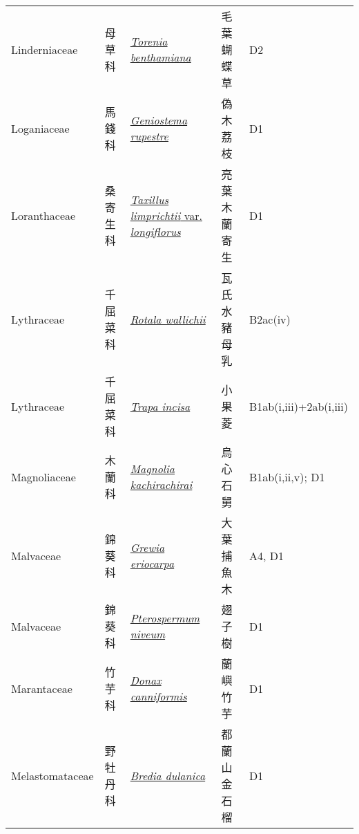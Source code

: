 {\begin{longtable}{p{2.5cm}p{2.5cm}p{4.5cm}p{2.5cm}p{3cm}}
    Linderniaceae & 母草科 & \href{http://www.theplantlist.org/tpl1.1/search?q=Torenia+benthamiana}{\textit{Torenia benthamiana} } & 毛葉蝴蝶草 & D2 \index{Torenia@\textit{Torenia}!benthamiana@\textit{benthamiana}}  \index{毛葉蝴蝶草} \\
    Loganiaceae & 馬錢科 & \href{http://www.theplantlist.org/tpl1.1/search?q=Geniostema+rupestre}{\textit{Geniostema rupestre} } & 偽木荔枝 & D1 \index{Geniostema@\textit{Geniostema}!rupestre@\textit{rupestre}}  \index{偽木荔枝} \\
    Loranthaceae & 桑寄生科 & \href{http://www.theplantlist.org/tpl1.1/search?q=Taxillus+limprichtii+var.+longiflorus}{\textit{Taxillus limprichtii} var. \textit{longiflorus} } & 亮葉木蘭寄生 & D1 \index{Taxillus@\textit{Taxillus}!limprichtii@\textit{limprichtii}!var. longiflorus@var. \textit{longiflorus}}  \index{亮葉木蘭寄生} \\
    Lythraceae & 千屈菜科 & \href{http://www.theplantlist.org/tpl1.1/search?q=Rotala+wallichii}{\textit{Rotala wallichii} } & 瓦氏水豬母乳 & B2ac(iv) \index{Rotala@\textit{Rotala}!wallichii@\textit{wallichii}}  \index{瓦氏水豬母乳} \\
    Lythraceae & 千屈菜科 & \href{http://www.theplantlist.org/tpl1.1/search?q=Trapa+incisa}{\textit{Trapa incisa} } & 小果菱 & B1ab(i,iii)+2ab(i,iii) \index{Trapa@\textit{Trapa}!incisa@\textit{incisa}}  \index{小果菱} \\
    Magnoliaceae & 木蘭科 & \href{http://www.theplantlist.org/tpl1.1/search?q=Magnolia+kachirachirai}{\textit{Magnolia kachirachirai} } & 烏心石舅 & B1ab(i,ii,v); D1 \index{Magnolia@\textit{Magnolia}!kachirachirai@\textit{kachirachirai}}  \index{烏心石舅} \\
    Malvaceae & 錦葵科 & \href{http://www.theplantlist.org/tpl1.1/search?q=Grewia+eriocarpa}{\textit{Grewia eriocarpa} } & 大葉捕魚木 & A4, D1 \index{Grewia@\textit{Grewia}!eriocarpa@\textit{eriocarpa}}  \index{大葉捕魚木} \\
    Malvaceae & 錦葵科 & \href{http://www.theplantlist.org/tpl1.1/search?q=Pterospermum+niveum}{\textit{Pterospermum niveum} } & 翅子樹 & D1 \index{Pterospermum@\textit{Pterospermum}!niveum@\textit{niveum}}  \index{翅子樹} \\
    Marantaceae & 竹芋科 & \href{http://www.theplantlist.org/tpl1.1/search?q=Donax+canniformis}{\textit{Donax canniformis} } & 蘭嶼竹芋 & D1 \index{Donax@\textit{Donax}!canniformis@\textit{canniformis}}  \index{蘭嶼竹芋} \\
    Melastomataceae & 野牡丹科 & \href{http://www.theplantlist.org/tpl1.1/search?q=Bredia+dulanica}{\textit{Bredia dulanica} } & 都蘭山金石榴 & D1 \index{Bredia@\textit{Bredia}!dulanica@\textit{dulanica}}  \index{都蘭山金石榴} \\

\end{longtable}}

